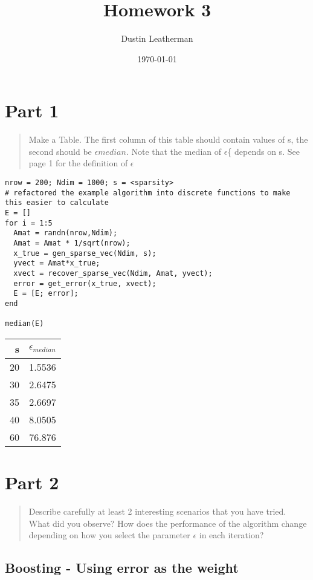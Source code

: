 \documentclass[11pt]{article}
\author{Dustin Leatherman}
\date{\today}
\title{Homework 3}
\begin{document}
\maketitle
\tableofcontents


\section{Part 1}
\label{sec:orged27aa4}

\begin{quote}
Make a Table. The first column of this table should contain values of s, the
second should be \(\epsilon{median}\). Note that the median of \(\epsilon\)\{ depends
on s. See page 1 for the definition of \(\epsilon\)
\end{quote}

\begin{verbatim}
nrow = 200; Ndim = 1000; s = <sparsity>
# refactored the example algorithm into discrete functions to make this easier to calculate
E = []
for i = 1:5
  Amat = randn(nrow,Ndim);
  Amat = Amat * 1/sqrt(nrow);
  x_true = gen_sparse_vec(Ndim, s);
  yvect = Amat*x_true;
  xvect = recover_sparse_vec(Ndim, Amat, yvect);
  error = get_error(x_true, xvect);
  E = [E; error];
end

median(E)
\end{verbatim}

\begin{center}
\begin{tabular}{rr}
s & \(\epsilon_{median}\)\\
\hline
20 & 1.5536\\
30 & 2.6475\\
35 & 2.6697\\
40 & 8.0505\\
60 & 76.876\\
\end{tabular}
\end{center}

\section{Part 2}
\label{sec:orgbb8721b}
\begin{quote}
Describe carefully at least 2 interesting scenarios that you have tried. What
did you observe? How does the performance of the algorithm change depending on how
you select the parameter \(\epsilon\) in each iteration?
\end{quote}

\subsection{Boosting - Using error as the weight}
\label{sec:org30da59d}
\end{document}
